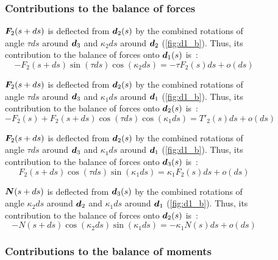\begin{figure}[p]
	\begin{fullpage}
	\subsubsection{Contributions to the balance of forces}
	\vspace{10pt}
	
	$\boldsymbol{F}_2(s+ds)$ is deflected from $\boldsymbol{d}_2(s)$ by the combined rotations of angle $\tau ds$ around $\boldsymbol{d}_3$ and $\kappa_2 ds$ around $\boldsymbol{d}_2$ (\cref{fig:d1_b}). Thus, its contribution to the balance of forces onto $\boldsymbol{d}_1(s)$ is~: 
	\begin{equation*}
		-F_2(s+ds) \sin(\tau ds) \cos(\kappa_2 ds) = -\tau F_2(s) ds + o(ds)
	\end{equation*}	
	
	$\boldsymbol{F}_2(s+ds)$ is deflected from $\boldsymbol{d}_2(s)$ by the combined rotations of angle $\tau ds$ around $\boldsymbol{d}_3$ and $\kappa_1 ds$ around $\boldsymbol{d}_1$ (\cref{fig:d1_b}). Thus, its contribution to the balance of forces onto $\boldsymbol{d}_2(s)$ is~: 
	\begin{equation*}
		-F_2(s) + F_2(s+ds) \cos(\tau ds) \cos(\kappa_1 ds) = T'_2 (s) ds + o(ds)
	\end{equation*}	
	
	$\boldsymbol{F}_2(s+ds)$ is deflected from $\boldsymbol{d}_2(s)$ by the combined rotations of angle $\tau ds$ around $\boldsymbol{d}_3$ and $\kappa_1 ds$ around $\boldsymbol{d}_1$ (\cref{fig:d1_b}). Thus, its contribution to the balance of forces onto $\boldsymbol{d}_3(s)$ is~: 
	\begin{equation*}
		F_2(s+ds) \cos(\tau ds) \sin(\kappa_1 ds) = \kappa_1 F_2(s) ds + o(ds)
	\end{equation*}
		
	$\boldsymbol{N}(s+ds)$ is deflected from $\boldsymbol{d}_3(s)$ by the combined rotations of angle $\kappa_2 ds$ around $\boldsymbol{d}_2$ and $\kappa_1 ds$ around $\boldsymbol{d}_1$ (\cref{fig:d1_b}). Thus, its contribution to the balance of forces onto $\boldsymbol{d}_2(s)$ is~: 
	\begin{equation*}
		-N(s+ds) \cos(\kappa_2 ds) \sin(\kappa_1 ds) = -\kappa_1 N(s) ds + o(ds)
	\end{equation*}	
	\vspace{10pt}

	\subsubsection{Contributions to the balance of moments}
	\vspace{10pt}
	

\end{fullpage}
\end{figure}
